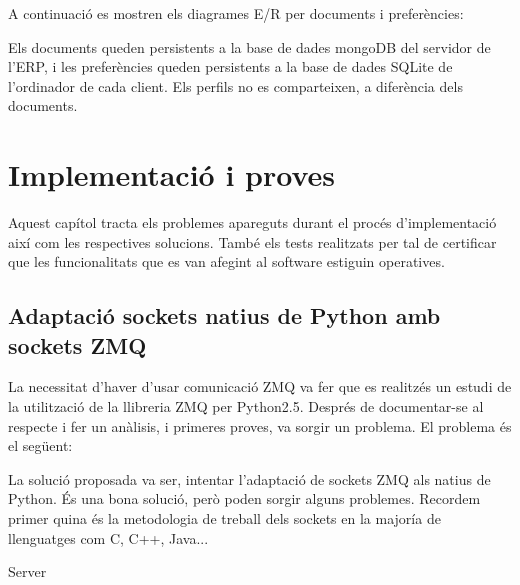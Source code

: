 \documentclass[letterpaper,11pt,catalan]{sphinxmanual}
\begin{document}
A continuació es mostren els diagrames E/R per documents i preferències:


Els documents queden persistents a la base de dades mongoDB del servidor de l'ERP,
i les preferències queden persistents a la base de dades SQLite de l'ordinador de
cada client. Els perfils no es comparteixen, a diferència dels documents.


\chapter{Implementació i proves}
\label{\detokenize{index:implementacio-i-proves}}
Aquest capítol tracta els problemes apareguts durant el procés d'implementació així com
les respectives solucions. També els tests realitzats per tal de certificar que les
funcionalitats que es van afegint al software estiguin operatives.


\section{Adaptació sockets natius de Python amb sockets ZMQ}
\label{\detokenize{index:adaptacio-sockets-natius-de-python-amb-sockets-zmq}}
La necessitat d'haver d'usar comunicació ZMQ va fer que es realitzés un estudi de la utilització de la llibreria ZMQ per Python2.5.
Després de documentar-se al respecte i fer un anàlisis, i primeres proves, va sorgir un problema.
El problema és el següent:


La solució proposada va ser, intentar l'adaptació de sockets ZMQ als natius de Python.
És una bona solució, però poden sorgir alguns problemes. Recordem primer quina és la metodologia de
treball dels sockets en la majoría de llenguatges com C, C++, Java...

Server

\begin{sphinxVerbatim}[commandchars=\\\{\}]
  
  
 
   
\end{sphinxVerbatim}
\end{document}
